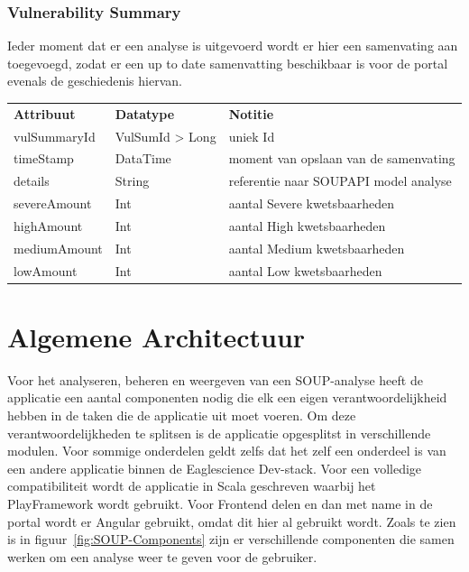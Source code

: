 \subsubsection{Vulnerability Summary}\label{subsubsec:portalVulSum}
Ieder moment dat er een analyse is uitgevoerd wordt er hier een samenvating aan toegevoegd, zodat er een up to date samenvatting beschikbaar is voor de portal evenals de geschiedenis hiervan.

\begin{tabular}{lll}
    \textbf{Attribuut} & \textbf{Datatype} & \textbf{Notitie}\\
    vulSummaryId & VulSumId > Long & uniek Id\\
    timeStamp & DataTime & moment van opslaan van de samenvating\\
    details & String & referentie naar SOUPAPI model analyse\\
    severeAmount & Int & aantal Severe kwetsbaarheden\\
    highAmount & Int & aantal High kwetsbaarheden\\
    mediumAmount & Int & aantal Medium kwetsbaarheden\\
    lowAmount & Int & aantal Low kwetsbaarheden\\
\end{tabular}

\section{Algemene Architectuur}\label{sec:algemene-architectuur}
Voor het analyseren, beheren en weergeven van een SOUP-analyse heeft de applicatie een aantal componenten nodig die elk een eigen verantwoordelijkheid hebben in de taken die de applicatie uit moet voeren. Om deze verantwoordelijkheden te splitsen is de applicatie opgesplitst in verschillende modulen. Voor sommige onderdelen geldt zelfs dat het zelf een onderdeel is van een andere applicatie binnen de Eaglescience Dev-stack. Voor een volledige compatibiliteit wordt de applicatie in Scala geschreven waarbij het PlayFramework wordt gebruikt. Voor Frontend delen en dan met name in de portal wordt er Angular gebruikt, omdat dit hier al gebruikt wordt. Zoals te zien is in figuur~\ref{fig:SOUP-Components} zijn er verschillende componenten die samen werken om een analyse weer te geven voor de gebruiker.

